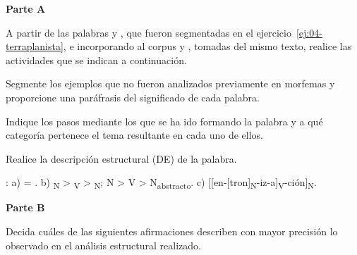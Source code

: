 \begin{ejercicio}\label{ej:04-tema}
\textbf{Parte A}

A partir de las palabras  y , que
fueron segmentadas en el ejercicio~\ref{ej:04-terraplanista}, e incorporando al
corpus  y , tomadas
del mismo texto, realice las actividades que se indican a continuación.

\begin{consignas}
  \item Segmente los ejemplos que no fueron analizados previamente en morfemas y
        proporcione una paráfrasis del significado de cada palabra.
  \item Indique los pasos mediante los que se ha ido formando la palabra y a qué
        categoría pertenece el tema resultante en cada uno de ellos.
  \item Realice la descripción estructural (DE) de la palabra.
\end{consignas}

\begin{resuelto}
: a)  = . b) \textsubscript{N} >
\textsubscript{V} > \textsubscript{N}; N >
V > N\textsubscript{abstracto}. c) [[en-[tron]\textsubscript{N}-iz-a]\textsubscript{V}-ción]\textsubscript{N}.
\end{resuelto}

\textbf{Parte B}

Decida cuáles de las siguientes afirmaciones describen con mayor precisión lo
observado en el análisis estructural realizado.


\end{ejercicio}
